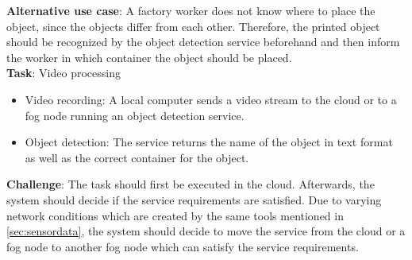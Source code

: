 \textbf{Alternative use case}: A factory worker does not know where to place the object, since the objects differ from each other. Therefore, the printed object should be recognized by the object detection service beforehand and then inform the worker in which container the object should be placed.\\

\textbf{Task}: Video processing
\begin{itemize}
    \item Video recording: A local computer sends a video stream to the cloud or to a fog node running an object detection service.
    \item Object detection: The service returns the name of the object in text format as well as the correct container for the object.\\
\end{itemize}

\textbf{Challenge}: The task should first be executed in the cloud. Afterwards, the system should decide if the service requirements are satisfied. Due to varying network conditions which are created by the same tools mentioned in \ref{sec:sensordata}, the system should decide to move the service from the cloud or a fog node to another fog node which can satisfy the service requirements.